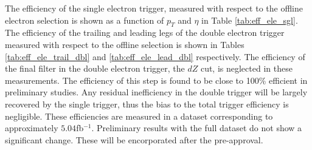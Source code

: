 
The efficiency of the single electron trigger, measured 
with respect to the offline electron selection is shown 
as a function of $p_T$ and $\eta$ in Table \ref{tab:eff_ele_sgl}.
The efficiency of the trailing and leading legs of the double electron trigger
measured with respect to the offline selection is shown
in Tables \ref{tab:eff_ele_trail_dbl} and \ref{tab:eff_ele_lead_dbl} respectively.
The efficiency of the final filter in the double electron trigger, the $dZ$ cut,
is neglected in these measurements.  The efficiency of this step is found to be
close to 100\% efficient in preliminary studies.  Any residual inefficiency
in the double trigger will be largely recovered by the single trigger,
thus the bias to the total trigger efficiency is negligible.
These efficiencies are measured in a dataset corresponding
to approximately $5.04$fb$^{-1}$.  Preliminary results with
the full dataset do not show a significant change. These will be encorporated 
after the pre-approval.


